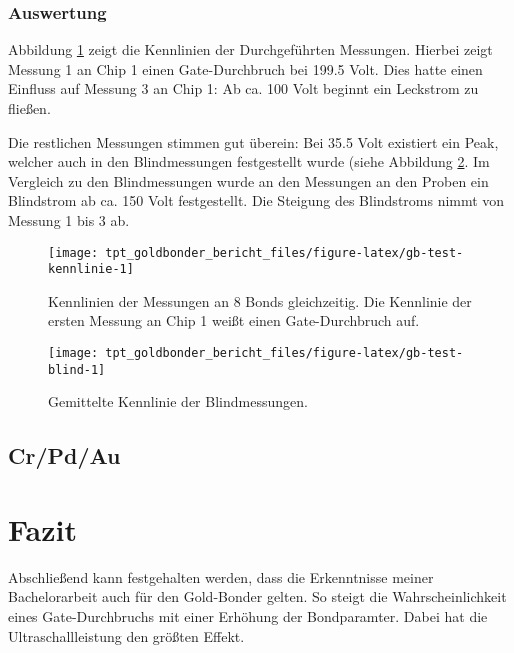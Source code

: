 \documentclass[
  paper=a4,
  ,captions=tableheading
]{scrartcl}
\begin{document}
\hypertarget{auswertung-1}{%
\subsubsection{Auswertung}\label{auswertung-1}}

Abbildung \ref{fig:gb-test-kennlinie} zeigt die Kennlinien der Durchgeführten Messungen. Hierbei zeigt Messung 1 an Chip 1 einen Gate-Durchbruch bei 199.5 Volt. Dies hatte einen Einfluss auf Messung 3 an Chip 1: Ab ca. 100 Volt beginnt ein Leckstrom zu fließen.

Die restlichen Messungen stimmen gut überein: Bei 35.5 Volt existiert ein Peak, welcher auch in den Blindmessungen festgestellt wurde (siehe Abbildung \ref{fig:gb-test-blind}. Im Vergleich zu den Blindmessungen wurde an den Messungen an den Proben ein Blindstrom ab ca. 150 Volt festgestellt. Die Steigung des Blindstroms nimmt von Messung 1 bis 3 ab.

\begin{figure}

{\centering \texttt{[image: tpt\_goldbonder\_bericht\_files/figure-latex/gb-test-kennlinie-1]} 

}

\caption{Kennlinien der Messungen an 8 Bonds gleichzeitig. Die Kennlinie der ersten Messung an Chip 1 weißt einen Gate-Durchbruch auf.}\label{fig:gb-test-kennlinie}
\end{figure}

\begin{figure}

{\centering \texttt{[image: tpt\_goldbonder\_bericht\_files/figure-latex/gb-test-blind-1]} 

}

\caption{Gemittelte Kennlinie der Blindmessungen.}\label{fig:gb-test-blind}
\end{figure}

\hypertarget{crpdau}{%
\subsection{Cr/Pd/Au}\label{crpdau}}

\hypertarget{conclusion}{%
\section{Fazit}\label{conclusion}}

Abschließend kann festgehalten werden, dass die Erkenntnisse meiner Bachelorarbeit auch für den Gold-Bonder gelten. So steigt die Wahrscheinlichkeit eines Gate-Durchbruchs mit einer Erhöhung der Bondparamter. Dabei hat die Ultraschallleistung den größten Effekt.
\end{document}
